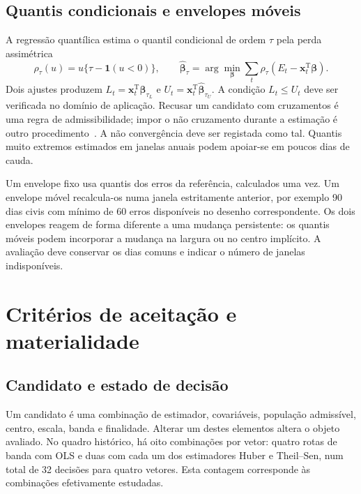 \subsection{Quantis condicionais e envelopes móveis}
\label{sec:mat-quantis}
A regressão quantílica estima o quantil condicional de ordem $\tau$ pela perda assimétrica~\parencite{KoenkerBassett1978}
\begin{equation}
\rho_\tau(u)=u\{\tau-\mathbf1(u<0)\},
\qquad \widehat{\boldsymbol\beta}_\tau
=\arg\min_{\boldsymbol\beta}\sum_t\rho_\tau(E_t-\boldsymbol x_t^{\mathrm T}\boldsymbol\beta).
\label{eq:mat-quantil}
\end{equation}
Dois ajustes produzem $L_t=\boldsymbol x_t^{\mathrm T}\widehat{\boldsymbol\beta}_{\tau_L}$ e $U_t=\boldsymbol x_t^{\mathrm T}\widehat{\boldsymbol\beta}_{\tau_U}$. A condição $L_t\leq U_t$ deve ser verificada no domínio de aplicação. Recusar um candidato com cruzamentos é uma regra de admissibilidade; impor o não cruzamento durante a estimação é outro procedimento~\parencite{Chernozhukov2010}. A não convergência deve ser registada como tal. Quantis muito extremos estimados em janelas anuais podem apoiar-se em poucos dias de cauda.

Um envelope fixo usa quantis dos erros da referência, calculados uma vez. Um envelope móvel recalcula-os numa janela estritamente anterior, por exemplo 90 dias civis com mínimo de 60 erros disponíveis no desenho correspondente. Os dois envelopes reagem de forma diferente a uma mudança persistente: os quantis móveis podem incorporar a mudança na largura ou no centro implícito. A avaliação deve conservar os dias comuns e indicar o número de janelas indisponíveis.


\section{Critérios de aceitação e materialidade}
\label{sec:mat-aceitacao}

\subsection{Candidato e estado de decisão}
\label{sec:mat-candidato}
Um candidato é uma combinação de estimador, covariáveis, população admissível, centro, escala, banda e finalidade. Alterar um destes elementos altera o objeto avaliado. No quadro histórico, há oito combinações por vetor: quatro rotas de banda com OLS e duas com cada um dos estimadores Huber e Theil--Sen, num total de 32 decisões para quatro vetores. Esta contagem corresponde às combinações efetivamente estudadas.

